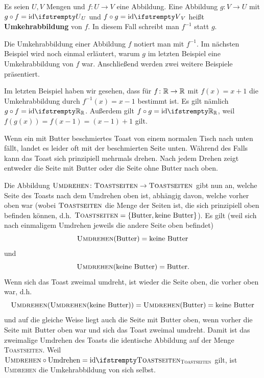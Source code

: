 \documentclass[../../main.tex]{subfiles}
\begin{document}
\begin{definition}[Umkehrabbildung]
    Es seien $U,V$ Mengen und $f\colon U\rightarrow V$ eine Abbildung. Eine Abbildung $g\colon V\rightarrow U$ mit $g\circ f=\ident[U]$ und $f\circ g=\ident[V]$ heißt \textbf{Umkehrabbildung} von $f$. In diesem Fall schreibt man $f^{-1}$ statt $g$.
\end{definition}

Die Umkehrabbildung einer Abbildung $f$ notiert man mit $f^{-1}$. Im nächsten Beispiel wird noch einmal erläutert, warum $g$ im letzten Beispiel eine Umkehrabbildung von $f$ war. Anschließend werden zwei weitere Beispiele präsentiert.

\begin{example}
    Im letzten Beispiel haben wir gesehen, dass für $f\colon\mathbb{R}\rightarrow\mathbb{R}$ mit $f(x)=x+1$ die Umkehrabbildung durch $f^{-1}(x)=x-1$ bestimmt ist. Es gilt nämlich $g\circ f=\ident[\Real]$. Außerdem gilt $f\circ g=\ident[\Real]$, weil $f(g(x))=f(x-1)=(x-1)+1$ gilt.
\end{example}

\begin{example}
    Wenn ein mit Butter beschmiertes Toast von einem normalen Tisch nach unten fällt, landet es leider oft mit der beschmierten Seite unten. Während des Falls kann das Toast sich prinzipiell mehrmals drehen. Nach jedem Drehen zeigt entweder die Seite mit Butter oder die Seite ohne Butter nach oben.
    
    Die Abbildung $\textsc{Umdrehen}\colon\textsc{Toastseiten}\rightarrow\textsc{Toastseiten}$ gibt nun an, welche Seite des Toasts nach dem Umdrehen oben ist, abhängig davon, welche vorher oben war (wobei $\textsc{Toastseiten}$ die Menge der Seiten ist, die sich prinzipiell oben befinden können, d.h. $\textsc{Toastseiten}=\{\text{Butter},\text{keine Butter}\}$). Es gilt (weil sich nach einmaligem Umdrehen jeweils die andere Seite oben befindet)
    \[\textsc{Umdrehen}(\text{Butter})=\text{keine Butter}\] und \[\textsc{Umdrehen}(\text{keine Butter})=\text{Butter}.\]
    Wenn sich das Toast zweimal umdreht, ist wieder die Seite oben, die vorher oben war, d.h. \[\textsc{Umdrehen}(\textsc{Umdrehen}(\text{keine Butter}))=\textsc{Umdrehen}(\text{Butter})=\text{keine Butter}\]
    und auf die gleiche Weise liegt auch die Seite mit Butter oben, wenn vorher die Seite mit Butter oben war und sich das Toast zweimal umdreht. Damit ist das zweimalige Umdrehen des Toasts die identische Abbildung auf der Menge \textsc{Toastseiten}. Weil $\textsc{Umdrehen}\circ \text{Umdrehen}=\ident[\textsc{Toastseiten}]$ gilt, ist \textsc{Umdrehen} die Umkehrabbildung von sich selbst.
\end{example}
\end{document}
